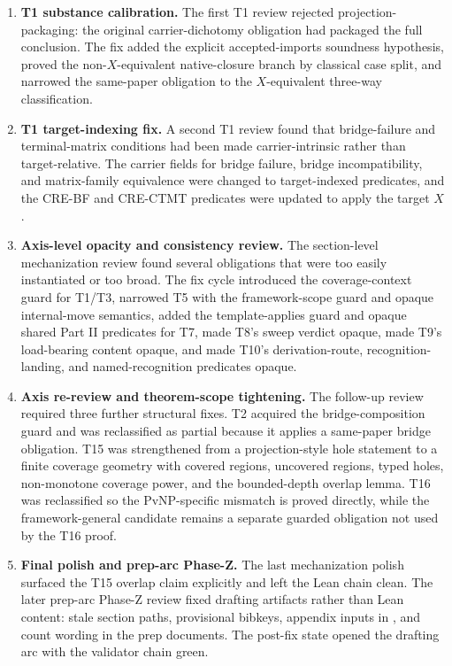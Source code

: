 \documentclass[11pt]{article}
\newcommand{\CREBF}{\textsc{CRE-BF}}
\newcommand{\CRECTMT}{\textsc{CRE-CTMT}}
\newcommand{\LeanDecl}[1]{\texttt{\detokenize{#1}}}
\theoremstyle{definition}
\begin{document}
\begin{enumerate}[label=\textbf{R\arabic*.}, leftmargin=*]
\item \textbf{T1 substance calibration.}  The first T1 review rejected
projection-packaging: the original carrier-dichotomy obligation had
packaged the full conclusion.  The fix added the explicit
accepted-imports soundness hypothesis, proved the non-\(X\)-equivalent
native-closure branch by classical case split, and narrowed the
same-paper obligation to the \(X\)-equivalent three-way classification.

\item \textbf{T1 target-indexing fix.}  A second T1 review found that
bridge-failure and terminal-matrix conditions had been made
carrier-intrinsic rather than target-relative.  The carrier fields for
bridge failure, bridge incompatibility, and matrix-family equivalence
were changed to target-indexed predicates, and the \CREBF{} and
\CRECTMT{} predicates were updated to apply the target \(X\).

\item \textbf{Axis-level opacity and consistency review.}  The
section-level mechanization review found several obligations that were
too easily instantiated or too broad.  The fix cycle introduced the
coverage-context guard for T1/T3, narrowed T5 with the framework-scope
guard and opaque internal-move semantics, added the template-applies
guard and opaque shared Part II predicates for T7, made T8's sweep
verdict opaque, made T9's load-bearing content opaque, and made T10's
derivation-route, recognition-landing, and named-recognition predicates
opaque.

\item \textbf{Axis re-review and theorem-scope tightening.}  The
follow-up review required three further structural fixes.  T2 acquired
the bridge-composition guard and was reclassified as partial because it
applies a same-paper bridge obligation.  T15 was strengthened from a
projection-style hole statement to a finite coverage geometry with
covered regions, uncovered regions, typed holes, non-monotone coverage
power, and the bounded-depth overlap lemma.  T16 was reclassified so
the PvNP-specific mismatch is proved directly, while the
framework-general candidate remains a separate guarded obligation not
used by the T16 proof.

\item \textbf{Final polish and prep-arc Phase-Z.}  The last
mechanization polish surfaced the T15 overlap claim explicitly and left
the Lean chain clean.  The later prep-arc Phase-Z review fixed drafting
artifacts rather than Lean content: stale section paths, provisional
bibkeys, appendix inputs in \LeanDecl{main.tex}, and count wording in
the prep documents.  The post-fix state opened the drafting arc with
the validator chain green.
\end{enumerate}
\end{document}
